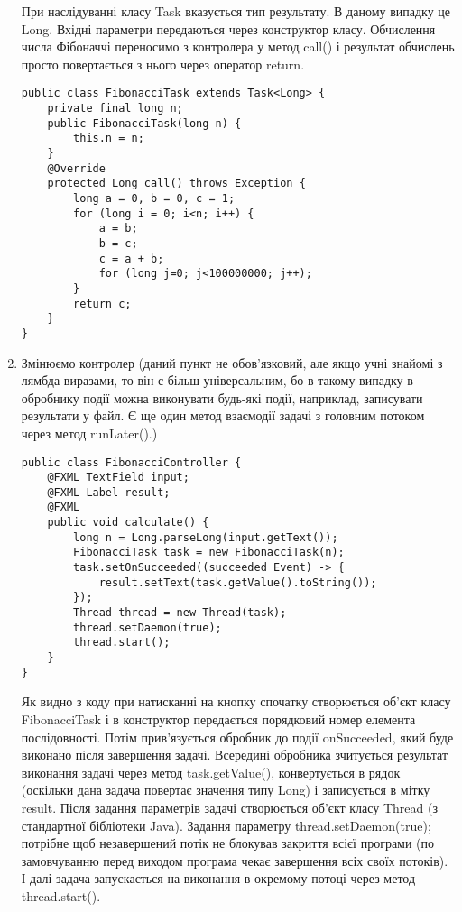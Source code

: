 \begin{enumerate}
	При наслідуванні класу Task вказується тип результату. В даному випадку це Long. Вхідні параметри передаються через конструктор класу. Обчислення числа Фібоначчі переносимо з контролера у метод call() і результат обчислень просто повертається з нього через оператор return.

\begin{verbatim}
public class FibonacciTask extends Task<Long> {
	private final long n;
	public FibonacciTask(long n) {
		this.n = n;
	}
	@Override
	protected Long call() throws Exception {
		long a = 0, b = 0, c = 1;
		for (long i = 0; i<n; i++) {
			a = b;
			b = c;
			c = a + b;
			for (long j=0; j<100000000; j++);
		}
		return c;
	}
}
\end{verbatim}

	\item Змінюємо контролер (даний пункт не обов'язковий, але якщо учні знайомі з лямбда-виразами, то він є більш універсальним, бо в такому випадку в обробнику події можна виконувати будь-які події, наприклад, записувати результати у файл. Є ще один метод взаємодії задачі з головним потоком через метод runLater().)

\begin{verbatim}
public class FibonacciController {
	@FXML TextField input;
	@FXML Label result;
	@FXML
	public void calculate() {
		long n = Long.parseLong(input.getText());
		FibonacciTask task = new FibonacciTask(n);
		task.setOnSucceeded((succeeded Event) -> {
			result.setText(task.getValue().toString());
		});
        Thread thread = new Thread(task);
        thread.setDaemon(true);
        thread.start();
	}
}
\end{verbatim}

Як видно з коду при натисканні на кнопку спочатку створюється об'єкт класу FibonacciTask і в конструктор передається порядковий номер елемента послідовності. Потім прив'язується обробник до події onSucceeded, який буде виконано після завершення задачі. Всередині обробника зчитується результат виконання задачі через метод task.getValue(), конвертується в рядок (оскільки дана задача повертає значення типу Long) і записується в мітку result.
Після задання параметрів задачі створюється об'єкт класу Thread (з стандартної бібліотеки Java). Задання параметру thread.setDaemon(true); потрібне щоб незавершений потік не блокував закриття всієї програми (по замовчуванню перед виходом програма чекає завершення всіх своїх потоків). І далі задача запускається на виконання в окремому потоці через метод thread.start().


\end{enumerate}

